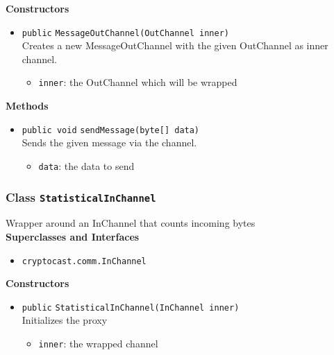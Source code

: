 \textbf{Constructors}
\begin{itemize}
\item \lstinline|public| \lstinline|MessageOutChannel|\lstinline|(OutChannel inner)|\\
Creates a new MessageOutChannel with the given OutChannel as inner channel.
\begin{itemize}
\item \lstinline|inner|: the OutChannel which will be wrapped
\end{itemize}



\end{itemize}


\textbf{Methods}
\begin{itemize}
\item \lstinline|public void| \lstinline|sendMessage|\lstinline|(byte[] data)|\\
Sends the given message via the channel.
\begin{itemize}
\item \lstinline|data|: the data to send
\end{itemize}



\end{itemize}

\subsubsection{Class \lstinline|StatisticalInChannel|}
Wrapper around an InChannel that counts incoming bytes \\


\textbf{Superclasses and Interfaces}
\begin{itemize}
\item \lstinline|cryptocast.comm.InChannel|
\end{itemize}



\textbf{Constructors}
\begin{itemize}
\item \lstinline|public| \lstinline|StatisticalInChannel|\lstinline|(InChannel inner)|\\
Initializes the proxy
\begin{itemize}
\item \lstinline|inner|: the wrapped channel
\end{itemize}



\end{itemize}


